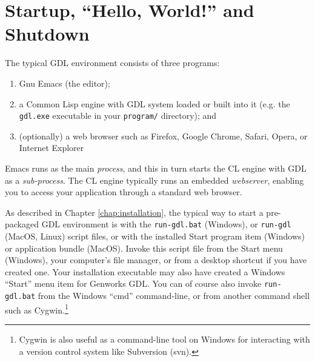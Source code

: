 \documentclass [11pt]{book}
\begin{document}
\section{Startup, ``Hello, World!'' and Shutdown}

\label{sec:startup,hello,world!andshutdown}



The typical GDL environment consists of three programs:

\begin{enumerate}

\item Gnu Emacs (the editor);

\item a Common Lisp engine with GDL system loaded or built into it (e.g. the \texttt{gdl.exe} executable in your \texttt{program/} directory); and

\item (optionally) a web browser such as Firefox, Google
Chrome, Safari, Opera, or Internet Explorer

\end{enumerate}

Emacs runs as the main \emph{process}, and this in turn starts the CL engine with GDL as a \emph{sub-process}. The CL engine typically runs an embedded \emph{webserver}, enabling you to access your application through a standard web browser.



As described in Chapter 
\ref{chap:installation}, the typical way to start a pre-packaged GDL environment is with the \texttt{run-gdl.bat} (Windows), or \texttt{run-gdl} (MacOS, Linux) script files, or with the installed Start
program item (Windows) or application bundle (MacOS). Invoke this
script file from the Start menu (Windows), your computer's file
manager, or from a desktop shortcut if you have created one.  Your
installation executable may also have created a Windows ``Start'' menu
item for Genworks GDL. You can of course also invoke \texttt{run-gdl.bat} from the Windows ``cmd'' command-line, or from another command shell such as Cygwin.\footnote{Cygwin is also useful as a command-line tool on Windows
for interacting with a version control system like Subversion (svn).}
\end{document}
